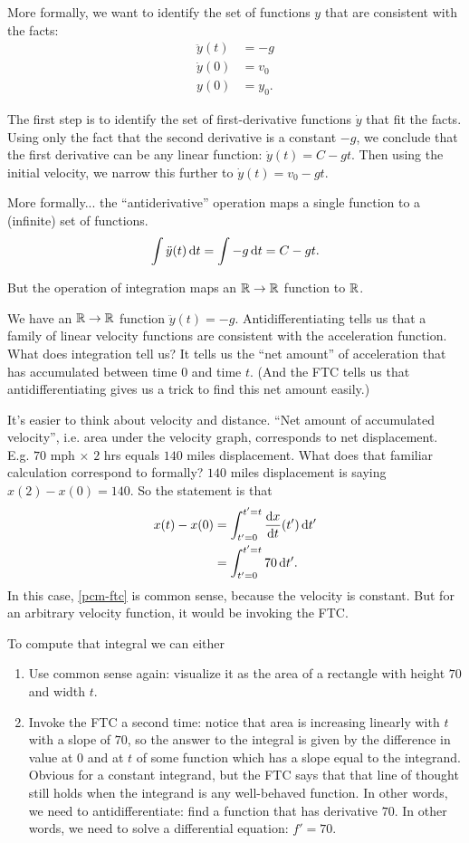 More formally, we want to identify the set of functions $y$ that are consistent with the facts:
\begin{align*}
  \ddot{y}(t) &= -g \\
  \dot{y}(0)  &= v_0 \\
  y(0)        &= y_0.
\end{align*}

The first step is to identify the set of first-derivative functions $\dot{y}$ that fit the
facts. Using only the fact that the second derivative is a constant $-g$, we conclude that the
first derivative can be any linear function: $\dot{y}(t) = C - gt$. Then using the initial
velocity, we narrow this further to $\dot{y}(t) = v_0 - gt$.

More formally... the ``antiderivative'' operation maps a single function to a (infinite) set of
functions.
\begin{align*}
  \int \ddot{y}(t) \dt = \int -g \dt = C - gt.
\end{align*}

But the operation of integration maps an $\mathbb{R} \to \mathbb{R}$ function to $\mathbb{R}$.

We have an $\mathbb{R} \to \mathbb{R}$ function $\ddot{y}(t) = -g$. Antidifferentiating tells us that a family of
linear velocity functions are consistent with the acceleration function. What does integration
tell us? It tells us the ``net amount'' of acceleration that has accumulated between time $0$ and
time $t$. (And the FTC tells us that antidifferentiating gives us a trick to find this net amount
easily.)

It's easier to think about velocity and distance. ``Net amount of accumulated velocity'',
i.e. area under the velocity graph, corresponds to net displacement. E.g. $70$ mph $\times$ $2$
hrs equals $140$ miles displacement. What does that familiar calculation correspond to formally?
$140$ miles displacement is saying $x(2) - x(0) = 140$. So the statement is that
\begin{align}
    x(t) - x(0) &= \int_{t'=0}^{t'=t} \dxdt(t') \dt' \label{pcm-ftc} \\
                &= \int_{t'=0}^{t'=t} 70 \dt'.       \nonumber
\end{align}
In this case, \eqref{pcm-ftc} is common sense, because the velocity is constant. But for an
arbitrary velocity function, it would be invoking the FTC.

To compute that integral we can either
\begin{enumerate}
\item Use common sense again: visualize it as the area of a rectangle with height $70$ and width
  $t$.
\item Invoke the FTC a second time: notice that area is increasing linearly with $t$ with a slope
  of $70$, so the answer to the integral is given by the difference in value at $0$ and at $t$ of
  some function which has a slope equal to the integrand. Obvious for a constant integrand, but
  the FTC says that that line of thought still holds when the integrand is any well-behaved
  function. In other words, we need to antidifferentiate: find a function that has derivative
  $70$. In other words, we need to solve a differential equation: $f' = 70$.
\end{enumerate}

